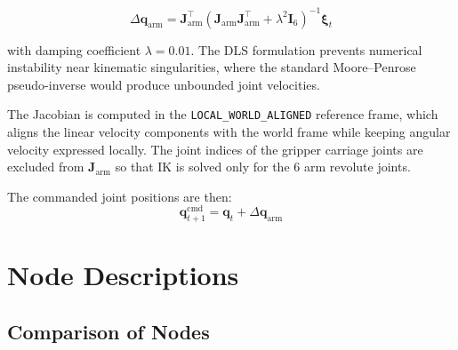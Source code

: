 \documentclass[12pt, a4paper]{article}
\begin{document}
\begin{equation}
  \Delta \mathbf{q}_{\text{arm}} =
  \mathbf{J}_{\text{arm}}^\top
  \left(\mathbf{J}_{\text{arm}}\mathbf{J}_{\text{arm}}^\top + \lambda^2 \mathbf{I}_6\right)^{-1}
  \boldsymbol{\xi}_t
  \label{eq:dls}
\end{equation}

with damping coefficient $\lambda = 0.01$. The DLS formulation prevents numerical
instability near kinematic singularities, where the standard Moore--Penrose
pseudo-inverse would produce unbounded joint velocities.

The Jacobian is computed in the \texttt{LOCAL\_WORLD\_ALIGNED} reference frame,
which aligns the linear velocity components with the world frame while keeping
angular velocity expressed locally. The joint indices of the gripper carriage joints
are excluded from $\mathbf{J}_{\text{arm}}$ so that IK is solved only for the 6 arm
revolute joints.

The commanded joint positions are then:
\begin{equation}
  \mathbf{q}_{t+1}^{\text{cmd}} = \mathbf{q}_t + \Delta \mathbf{q}_{\text{arm}}
  \label{eq:q_cmd}
\end{equation}

\section{Node Descriptions}
\label{sec:nodes}

\subsection{Comparison of Nodes}
\label{ssec:node_compare}
\end{document}
